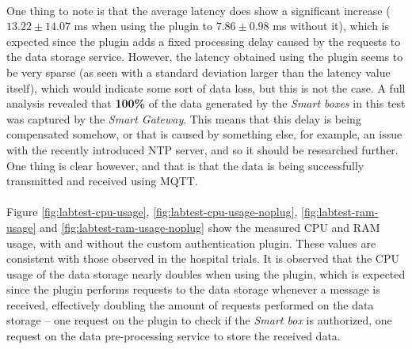 \paragraph{} One thing to note is that the average latency does show a significant increase ($13.22 \pm 14.07$ ms when using the plugin to $7.86 \pm 0.98$ ms without it), which is expected since the plugin adds a fixed processing delay caused by the requests to the data storage service. However, the latency obtained using the plugin seems to be very sparse (as seen with a standard deviation larger than the latency value itself), which would indicate some sort of data loss, but this is not the case. A full analysis revealed that \textbf{100\%} of the data generated by the \textit{Smart boxes} in this test was captured by the \textit{Smart Gateway}. This means that this delay is being compensated somehow, or that is caused by something else, for example, an issue with the recently introduced \acs{NTP} server, and so it should be researched further. One thing is clear however, and that is that the data is being successfully transmitted and received using \acs{MQTT}. 

\paragraph{} Figure \ref{fig:labtest-cpu-usage}, \ref{fig:labtest-cpu-usage-noplug}, \ref{fig:labtest-ram-usage} and \ref{fig:labtest-ram-usage-noplug} show the measured \acs{CPU} and \acs{RAM} usage, with and without the custom authentication plugin. These values are consistent with those observed in the hospital trials. It is observed that the \acs{CPU} usage of the data storage nearly doubles when using the plugin, which is expected since the plugin performs requests to the data storage whenever a message is received, effectively doubling the amount of requests performed on the data storage -- one request on the plugin to check if the \textit{Smart box} is authorized, one request on the data pre-processing service to store the received data.

